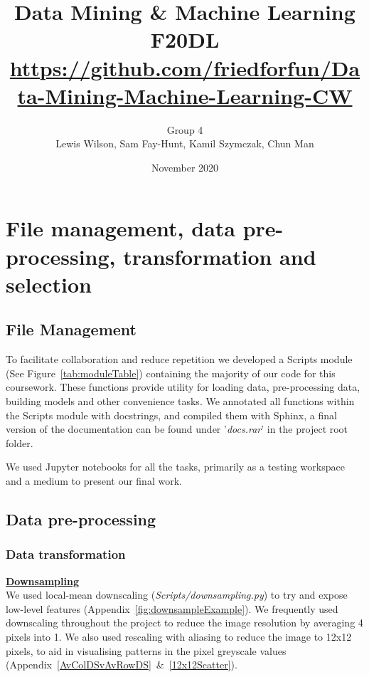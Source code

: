 \documentclass[11pt]{article}
\title{{\huge Data Mining \& Machine Learning F20DL} \\ {\small{\url{https://github.com/friedforfun/Data-Mining-Machine-Learning-CW}}}}
\author{Group 4\\Lewis Wilson, Sam Fay-Hunt, Kamil Szymczak, Chun Man }
\date{November 2020}
\begin{document}
\maketitle

\pagebreak

\tableofcontents
\thispagestyle{empty}
\pagebreak
\setcounter{page}{1}

\pagebreak

\section{File management, data pre-processing, transformation and selection} 
\subsection{File Management}

To facilitate collaboration and reduce repetition we developed a Scripts module (See Figure~\ref{tab:moduleTable}) containing the majority of our code for this coursework. These functions provide utility for loading data, pre-processing data, building models and other convenience tasks. We annotated all functions within the Scripts module with docstrings, and compiled them with Sphinx, a final version of the documentation can be found under '\emph{docs.rar}' in the project root folder.
\par
We used Jupyter notebooks for all the tasks, primarily as a testing workspace and a medium to present our final work.

\subsection{Data pre-processing}\label{sec:transSel}
\subsubsection{Data transformation}
\textbf{\underline{Downsampling}}\\
We used local-mean downscaling (\emph{Scripts/downsampling.py}) to try and expose low-level features
(Appendix~\ref{fig:downsampleExample}). We frequently used downscaling throughout the project to reduce the image resolution by averaging 4 pixels into 1. 
We also used rescaling with aliasing to reduce the image to 12x12 pixels, to aid in visualising patterns in the pixel greyscale values (Appendix~\ref{AvColDSvAvRowDS}~\&~\ref{12x12Scatter}).
\par
\end{document}
